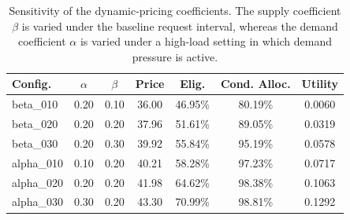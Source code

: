 \begin{table}[t]
\centering
\caption{Sensitivity of the dynamic-pricing coefficients. The supply coefficient $\beta$ is varied under the baseline request interval, whereas the demand coefficient $\alpha$ is varied under a high-load setting in which demand pressure is active.}
\label{tab:c25b_pricing_sensitivity}
\begin{tabular}{lcccccc}
\hline
Config. & $\alpha$ & $\beta$ & Price & Elig. & Cond. Alloc. & Utility \\
\hline
beta_010 & 0.20 & 0.10 & 36.00 & 46.95\% & 80.19\% & 0.0060 \\
beta_020 & 0.20 & 0.20 & 37.96 & 51.61\% & 89.05\% & 0.0319 \\
beta_030 & 0.20 & 0.30 & 39.92 & 55.84\% & 95.19\% & 0.0578 \\
alpha_010 & 0.10 & 0.20 & 40.21 & 58.28\% & 97.23\% & 0.0717 \\
alpha_020 & 0.20 & 0.20 & 41.98 & 64.62\% & 98.38\% & 0.1063 \\
alpha_030 & 0.30 & 0.20 & 43.30 & 70.99\% & 98.81\% & 0.1292 \\
\hline
\end{tabular}
\end{table}